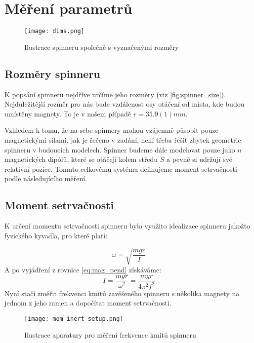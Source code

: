 
\chapter{Měření parametrů}
\label{chap:param}

\begin{wrapfigure}{r}{0.5\textwidth}
    \vspace*{0.75cm}
    \texttt{[image: dims.png]}
    \centering
    \caption{Ilustrace spinneru společně s vyznačenými rozměry}
    \label{fig:spinner_size}
\end{wrapfigure}

\section{Rozměry spinneru}
\label{sec:spinner_size}
K popsání spinneru nejdříve určíme jeho rozměry (viz \autoref{fig:spinner_size}).
Nejdůležitější rozměr pro nás bude vzdálenost osy otáčení od místa, kde budou umístěny magnety.
To je v našem případě $r = 35.9(1)mm$.

Vzhledem k tomu, že na sebe spinnery mohou vzájemně působit pouze magnetickými silami, jak je řečeno v zadání, není třeba řešit zbytek geometrie spinneru v budoucích modelech.
Spinner budeme dále modelovat pouze jako $n$ magnetických dipólů, které se otáčejí kolem středu $S$ a pevně si udržují své relativní pozice.
Tomuto celkovému systému definujeme moment setrvačnosti podle následujícího měření.
\section{Moment setrvačnosti}
\label{sec:moment_of_inertia}
{\raggedright
    K určení momentu setrvačnosti spinneru bylo využito idealizace spinneru jakožto fyzického kyvadla, pro které platí: \cite{physical_pendulum}
}
\begin{equation}
    \label{eq:mag_pend}
    \omega = \sqrt{\frac{mgr}{I}}
\end{equation}
A po vyjádření z rovnice \ref{eq:mag_pend} získáváme:
\begin{equation}
    \label{eq:mom_inert}
    I = \frac{mgr}{\omega^2} = \frac{mgr}{4\pi^2f^2}
\end{equation}
Nyní stačí změřit frekvenci kmitů zavěšeného spinneru s několika magnety na jednom z jeho ramen a dopočítat moment setrvačnosti.

\begin{wrapfigure}{r}{0.5\textwidth}
    \vspace*{-0.75cm}
    \texttt{[image: mom\_inert\_setup.png]}
    \centering
    \caption{Ilustrace aparatury pro měření frekvence kmitů spinneru}
    \label{fig:spinner_pendulum_aparature}
\end{wrapfigure}
